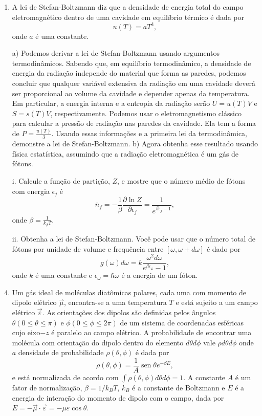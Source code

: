 \begin{enumerate}[start=1,label={\bfseries Q\arabic*.}]
\item A lei de Stefan-Boltzmann diz que a densidade de energia total do campo eletromagnético dentro de uma cavidade em equilíbrio térmico é dada por
$$
u(T) = a T^{4},
$$
onde $a$ é uma constante.


  a) Podemos derivar a lei de Stefan-Boltzmann usando argumentos termodinâmicos. Sabendo que, em equilíbrio termodinâmico, a densidade de energia da radiação independe do material que forma as paredes, podemos concluir que qualquer variável extensiva da radiação em uma cavidade deverá ser proporcional ao volume da cavidade e depender apenas da temperatura. Em particular, a energia interna e a entropia da radiação serão $U = u(T) V$ e $S = s(T) V$, respectivamente. Podemos usar o eletromagnetismo clássico para calcular a pressão de radiação nas paredes da cavidade. Ela tem a forma de $P = \frac{u(T)}{3}$. Usando essas informações e a primeira lei da termodinâmica, demonstre a lei de Stefan-Boltzmann.
  b) Agora obtenha esse resultado usando física estatística, assumindo que a radiação eletromagnética é um gás de fótons.
  
    \item[i.] Calcule a função de partição, $Z$, e mostre que o número médio de fótons com energia $\epsilon_{j}$ é
    $$
    \overline{n}_{f} = - \frac{1}{\beta} \frac{\partial \operatorname{ln} Z}{\partial \epsilon_{j}} = \frac{1}{e^{\beta \epsilon_{j} - 1}},
    $$
    onde $\beta = \frac{1}{k_{\beta}T}$.
    \item[ii.] Obtenha a lei de Stefan-Boltzmann. Você pode usar que o número total de fótons por unidade de volume e frequência entre $[\omega, \omega + d \omega]$ é dado por
        $$
        g(\omega)d\omega = k \frac{\omega^{2} d \omega}{e^{\beta \epsilon_{\omega}} - 1},
        $$
        onde $k$ é uma constante e $\epsilon_{\omega} = \hbar \omega$ é a energia de um fóton.
  






\item Um gás ideal de moléculas diatômicas polares, cada uma com momento de dipolo elétrico $\vec{\mu}$, encontra-se a uma temperatura $T$ e está sujeito a um campo elétrico $\vec{\varepsilon}$. As orientações dos dipolos são definidas pelos ângulos $\theta(0 \leq \theta \leq \pi)$ e $\phi ( 0 \leq \phi \leq 2 \pi)$ de um sistema de coordenadas esféricas cujo eixo$-z$ é paralelo ao campo elétrico. A probabilidade de encontrar uma molécula com orientação do dipolo dentro do elemento $d\theta d\phi$ vale $\rho d \theta d \phi$ onde $a$ densidade de probabilidade $\rho(\theta, \phi)$ é dada por
$$
\rho (\theta, \phi) = \frac{1}{A} \operatorname{sen} \theta e^{-\beta E},
$$
e está normalizada de acordo com $\int \rho(\theta, \phi)d\theta d \phi = 1$. A constante $A$ é um fator de normalização, $\beta = 1/k_{B} T$, $k_{B}$ é a constante de Boltzmann e $E$ é a energia de interação do momento de dipolo com o campo, dada por $E = - \vec{\mu} \cdot \vec{ \varepsilon} = - \mu \varepsilon \operatorname{cos} \theta$.


\end{enumerate}
